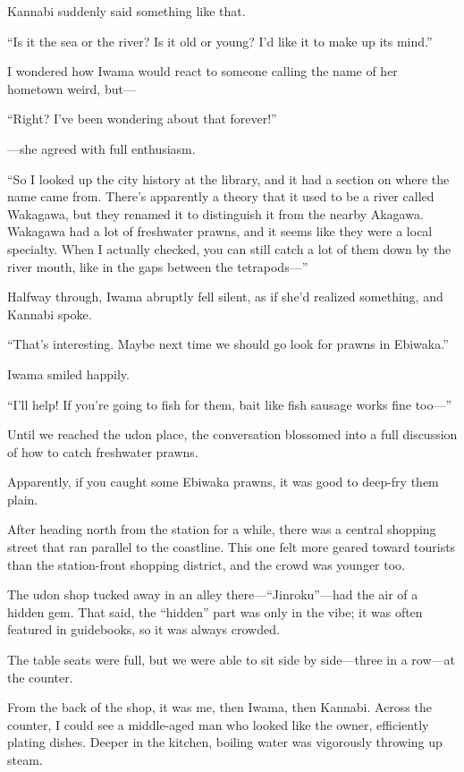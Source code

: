 \documentclass[
    a4paper,
    12pt,
    twoside,
    openany,
    UTF8,
    fontset=windows
]{ctexbook}
\begin{document}
Kannabi suddenly said something like that.

``Is it the sea or the river? Is it old or young? I'd like it to make up its mind.''

I wondered how Iwama would react to someone calling the name of her hometown weird, but---

``Right? I've been wondering about that forever!''

---she agreed with full enthusiasm.

``So I looked up the city history at the library, and it had a section on where the name came from. There's apparently a theory that it used to be a river called Wakagawa, but they renamed it to distinguish it from the nearby Akagawa. Wakagawa had a lot of freshwater prawns, and it seems like they were a local specialty. When I actually checked, you can still catch a lot of them down by the river mouth, like in the gaps between the tetrapods---''

Halfway through, Iwama abruptly fell silent, as if she'd realized something, and Kannabi spoke.

``That's interesting. Maybe next time we should go look for prawns in Ebiwaka.''

Iwama smiled happily.

``I'll help! If you're going to fish for them, bait like fish sausage works fine too---''

Until we reached the udon place, the conversation blossomed into a full discussion of how to catch freshwater prawns.

Apparently, if you caught some Ebiwaka prawns, it was good to deep-fry them plain.

After heading north from the station for a while, there was a central shopping street that ran parallel to the coastline. This one felt more geared toward tourists than the station-front shopping district, and the crowd was younger too.

The udon shop tucked away in an alley there---``Jinroku''---had the air of a hidden gem. That said, the ``hidden'' part was only in the vibe; it was often featured in guidebooks, so it was always crowded.

The table seats were full, but we were able to sit side by side---three in a row---at the counter.

From the back of the shop, it was me, then Iwama, then Kannabi. Across the counter, I could see a middle-aged man who looked like the owner, efficiently plating dishes. Deeper in the kitchen, boiling water was vigorously throwing up steam.
\end{document}
